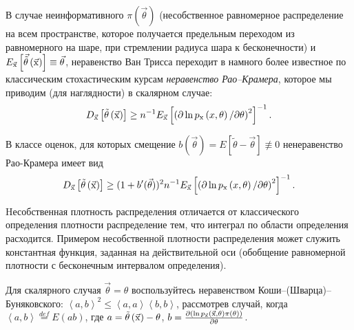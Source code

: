 \begin{remark}
В случае неинформативного $\pi (\vec{\theta})$ (несобственное равномерное распределение на всем пространстве, которое получается предельным переходом из равномерного на шаре, при стремлении радиуса шара к бесконечности) и $E_{\vec{{\rm x}}} \left[\vec{\tilde{\theta }}\left(\vec{{\rm x}}\right)\right]\equiv \vec{\theta }$, неравенство Ван Трисса переходит в намного более известное по классическим стохастическим курсам \textit{неравенство Рао--Крамера}, которое мы приводим (для наглядности) в скалярном случае: \[D_{\vec{{\rm x}}} \left[\tilde{\theta }\left(\vec{{\rm x}}\right)\right]\ge n^{-1} E_{\vec{{\rm x}}} \left[\left({\partial \ln p_{{\rm x}} \left(x,\theta \right)\mathord{\left/ {\vphantom {\partial \ln p_{{\rm x}} \left(x,\theta \right) \partial \theta }} \right. \kern-\nulldelimiterspace} \partial \theta } \right)^{2} \right]^{-1} .\]

В классе оценок, для которых смещение $b(\vec{\theta}) = E[\tilde{\theta} - \vec{\theta}] \not\equiv 0$ ненеравенство Рао-Крамера имеет вид \[D_{\vec{{\rm x}}} \left[\tilde{\theta }\left(\vec{{\rm x}}\right)\right]\ge (1 + b'(\vec{\theta}))^2 n^{-1} E_{\vec{{\rm x}}} \left[\left({\partial \ln p_{{\rm x}} \left(x,\theta \right)\mathord{\left/ {\vphantom {\partial \ln p_{{\rm x}} \left(x,\theta \right) \partial \theta }} \right. \kern-\nulldelimiterspace} \partial \theta } \right)^{2} \right]^{-1} .\] 
\end{remark}

\begin{remark}
Hесобственная плотность распределения отличается от классического определения плотности распределение тем, что интеграл по области определения расходится. Примером несобственной плотности распределения может служить константная функция, заданная на действительной оси (обобщение равномерной плотности с бесконечным интервалом определения). 
\end{remark}


\begin{ordre}
Для скалярного случая $\vec{\theta }=\theta $ воспользуйтесь неравенством Коши--(Шварца)--Буняковского: $\left\langle a,b\right\rangle ^{2} \le \left\langle a,a\right\rangle \left\langle b,b\right\rangle $, рассмотрев случай, когда
 $\left\langle a,b\right\rangle \mathop{=}\limits^{def} E\left(ab\right)$, где $a=\tilde{\theta }\left(\vec{{\rm x}}\right)-\theta $, $b=\frac{\partial \left(\ln p_{\vec{{\rm x}}} \left(\vec{{\rm x}},\theta \right)\pi \left(\theta \right)\right)}{\partial \theta } $.

\end{ordre}

